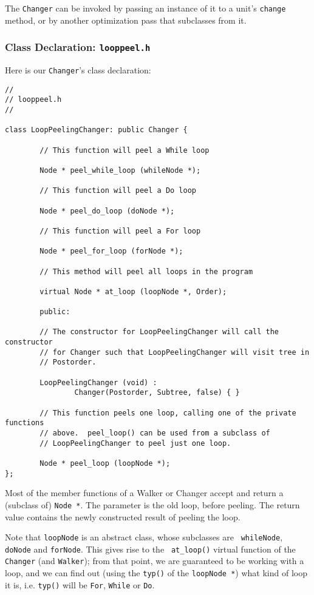 \documentclass[10pt]{article}
\begin{document}
The {\tt Changer} can be invoked by passing an instance of it to a unit's
{\tt change} method, or by another optimization pass that subclasses from
it.

\subsubsection{Class Declaration: {\tt looppeel.h}}

Here is our {\tt Changer}'s class declaration:

\begin{small}
\begin{verbatim}
//
// looppeel.h
//

class LoopPeelingChanger: public Changer {

        // This function will peel a While loop

        Node * peel_while_loop (whileNode *);

        // This function will peel a Do loop

        Node * peel_do_loop (doNode *);

        // This function will peel a For loop

        Node * peel_for_loop (forNode *);

        // This method will peel all loops in the program

        virtual Node * at_loop (loopNode *, Order);

        public:

        // The constructor for LoopPeelingChanger will call the constructor 
        // for Changer such that LoopPeelingChanger will visit tree in 
        // Postorder.

        LoopPeelingChanger (void) :
                Changer(Postorder, Subtree, false) { }

        // This function peels one loop, calling one of the private functions 
        // above.  peel_loop() can be used from a subclass of 
        // LoopPeelingChanger to peel just one loop.

        Node * peel_loop (loopNode *);
};
\end{verbatim}
\end{small}

Most of the member functions of a Walker or Changer accept and return a
(subclass of) {\tt Node *}.  The parameter is the old loop, before peeling.
The return value contains the newly constructed result of peeling the loop.

Note that {\tt loopNode} is an abstract class, whose subclasses are {\tt
whileNode}, {\tt doNode} and {\tt forNode}.  This gives rise to the {\tt
at\_loop()} virtual function of the {\tt Changer} (and {\tt Walker}); from
that point, we are guaranteed to be working with a loop, and we can find out
(using the {\tt typ()} of the {\tt loopNode *}) what kind of loop it is, i.e.
{\tt typ()} will be {\tt For}, {\tt While} or {\tt Do}.
\end{document}
